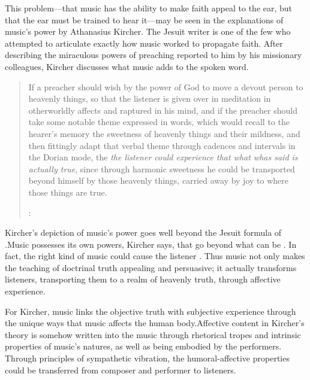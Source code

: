 This problem---that music has the ability to make faith appeal to the ear, but that the ear must be trained to hear it---may be seen in the explanations of music's power by Athanasius Kircher.
The Jesuit writer is one of the few who attempted to articulate exactly how music worked to propagate faith.\citXXX
After describing the miraculous powers of preaching reported to him by his missionary colleagues, Kircher discusses what music adds to the spoken word.
\begin{quote}
If a preacher should wish by the power of God to move a devout person to heavenly things, so that the listener is given over in meditation in otherworldly affects and raptured in his mind,
and if the preacher should take some notable theme expressed in words,
which would recall to the hearer's memory the sweetness of heavenly things and their mildness,
and then fittingly adapt that verbal theme through cadences and intervals in the Dorian mode,
the \emph{the listener could experience that what whas said is actually true}, 
since through harmonic sweetness he could be transported beyond himself by those heavenly things,
carried away by joy to where those things are true.%
  \begin{Footnote}
  \autocite[bk.\~7, 550 (emphasis added)]{Kircher:Musurgia}:
  \end{Footnote}
\end{quote}

Kircher's depiction of music's power goes well beyond the Jesuit formula of .
Music possesses its own powers, Kircher says, that go beyond what can be .
In fact, the right kind of music could cause the listener .
Thus music not only makes the teaching of doctrinal truth appealing and persuasive; it actually transforms listeners, transporting them to a realm of heavenly truth, through affective experience.

For Kircher, music links the objective truth with subjective experience through the unique ways that music affects the human body.
Affective content in Kircher's theory is somehow written into the music through rhetorical tropes and intrinsic properties of music's natures, as well as being embodied by the performers.
Through principles of sympathetic vibration, the humoral-affective properties could be transferred from composer and performer to listeners.

